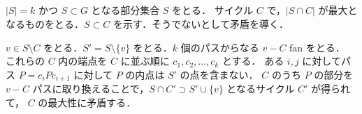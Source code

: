 \subsection{}
$|S| = k$ かつ $S \subset G$ となる部分集合 $S$ をとる．
サイクル $C$ で，$|S\cap C|$ が最大となるものをとる．$S\subset C$ を示す．そうでないとして矛盾を導く．

$v\in S\setminus C$ をとる．$S' = S\setminus \{v\}$ をとる．$k$ 個のパスからなる $v-C$ fan をとる．
これらの $C$ 内の端点を $C$ に並ぶ順に $c_1,c_2,\ldots, c_k$ とする．
ある $i,j$ に対してパス $P = c_iPc_{i+1}$ に対して $P$ の内点は $S'$ の点を含まない．
$C$ のうち $P$ の部分を $v-C$ パスに取り換えることで，$S\cap C' \supset S'\cup \{v\}$ となるサイクル $C'$ が得られて，
$C$ の最大性に矛盾する．